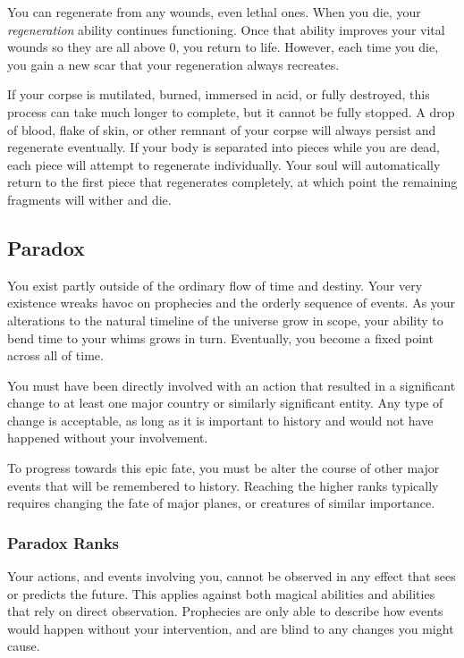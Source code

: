        You can regenerate from any wounds, even lethal ones.
      When you die, your \textit{regeneration} ability continues functioning.
      Once that ability improves your vital wounds so they are all above 0, you return to life.
      However, each time you die, you gain a new scar that your regeneration always recreates.

      If your corpse is mutilated, burned, immersed in acid, or fully destroyed, this process can take much longer to complete, but it cannot be fully stopped.
      A drop of blood, flake of skin, or other remnant of your corpse will always persist and regenerate eventually.
      If your body is separated into pieces while you are dead, each piece will attempt to regenerate individually.
      Your soul will automatically return to the first piece that regenerates completely, at which point the remaining fragments will wither and die.

  \subsection{Paradox}
    You exist partly outside of the ordinary flow of time and destiny.
    Your very existence wreaks havoc on prophecies and the orderly sequence of events.
    As your alterations to the natural timeline of the universe grow in scope, your ability to bend time to your whims grows in turn.
    Eventually, you become a fixed point across all of time.

     You must have been directly involved with an action that resulted in a significant change to at least one major country or similarly significant entity.
    Any type of change is acceptable, as long as it is important to history and would not have happened without your involvement.

     To progress towards this epic fate, you must be alter the course of other major events that will be remembered to history.
    Reaching the higher ranks typically requires changing the fate of major planes, or creatures of similar importance.

    \subsubsection{Paradox Ranks}
       Your actions, and events involving you, cannot be observed in any effect that sees or predicts the future.
      This applies against both magical abilities and abilities that rely on direct observation.
      Prophecies are only able to describe how events would happen without your intervention, and are blind to any changes you might cause.

